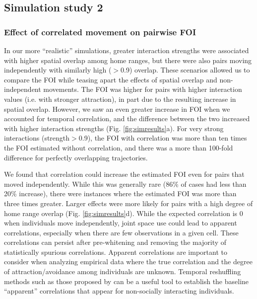 \documentclass[letterpaper]{article}
\begin{document}
\subsection*{Simulation study 2}

\subsubsection*{Effect of correlated movement on pairwise FOI}

In our more ``realistic'' simulations, greater interaction strengths were associated with higher spatial overlap among home ranges, but there were also pairs moving independently with similarly high  ($>$0.9) overlap. 
These scenarios allowed us to compare the FOI while teasing apart the effects of spatial overlap and non-independent movements. 
The FOI was higher for pairs with higher interaction values (i.e. with stronger attraction), in part due to the resulting increase in spatial overlap. 
However, we saw an even greater increase in FOI when we accounted for temporal correlation, and the difference between the two increased with higher interaction strengths (Fig. \ref{fig:simresults}a). For very strong interactions (strength$>$0.9), the FOI with correlation was more than ten times the FOI estimated without correlation, and there was a more than 100-fold difference for perfectly overlapping trajectories.  


We found that correlation could increase the estimated FOI even for pairs that moved independently. While this was generally rare (86\% of cases had less than 20\% increase),
there were  instances where the estimated FOI was more than three times greater. Larger effects were more likely for pairs with a high degree of home range overlap (Fig. \ref{fig:simresults}d). 
While the expected correlation is 0 when individuals move independently, joint space use could lead to apparent correlations, especially when there are few observations in a given cell. These correlations can persist after pre-whitening and removing the majority of statistically spurious correlations. Apparent correlations are important to consider when analyzing empirical data where the true correlation and the degree of attraction/avoidance among individuals are unknown. Temporal reshuffling methods such as those proposed by \citet{Spiegel2016} can be a useful tool to establish the baseline ``apparent'' correlations that appear for non-socially interacting individuals. 
\end{document}
